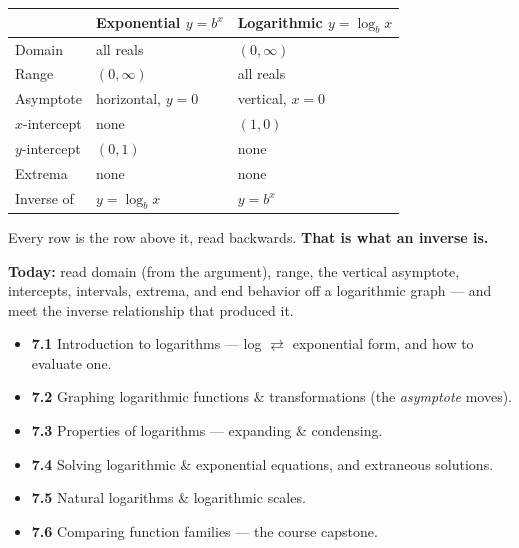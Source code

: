 \documentclass[aspectratio=169, 11pt]{beamer}
\begin{document}
\begin{frame}[t, plain]
  \begin{center}
  \renewcommand{\arraystretch}{1.35}
  \begin{tabular}{lll}
  \hline
   & \textbf{Exponential} $y=b^x$ & \textbf{Logarithmic} $y=\log_b x$ \\
  \hline
  Domain & all reals & $(0,\infty)$ \\
  Range & $(0,\infty)$ & all reals \\
  Asymptote & horizontal, $y=0$ & vertical, $x=0$ \\
  $x$-intercept & none & $(1,0)$ \\
  $y$-intercept & $(0,1)$ & none \\
  Extrema & none & none \\
  Inverse of & $y=\log_b x$ & $y=b^x$ \\
  \hline
  \end{tabular}
  \end{center}
  \vspace{4pt}
  \begin{center}
    Every row is the row above it, read backwards. \textbf{That is what an inverse is.}
  \end{center}
\end{frame}

\begin{frame}[t, plain]
  \textbf{Today:} read domain (from the argument), range, the vertical asymptote, intercepts,
  intervals, extrema, and end behavior off a logarithmic graph --- and meet the inverse relationship
  that produced it.\\[8pt]
  \begin{itemize}\setlength{\itemsep}{3pt}
    \item \textbf{7.1} Introduction to logarithms --- log $\rightleftarrows$ exponential form, and how to evaluate one.
    \item \textbf{7.2} Graphing logarithmic functions \& transformations (the \emph{asymptote} moves).
    \item \textbf{7.3} Properties of logarithms --- expanding \& condensing.
    \item \textbf{7.4} Solving logarithmic \& exponential equations, and extraneous solutions.
    \item \textbf{7.5} Natural logarithms \& logarithmic scales.
    \item \textbf{7.6} Comparing function families --- the course capstone.
  \end{itemize}
\end{frame}
\end{document}
